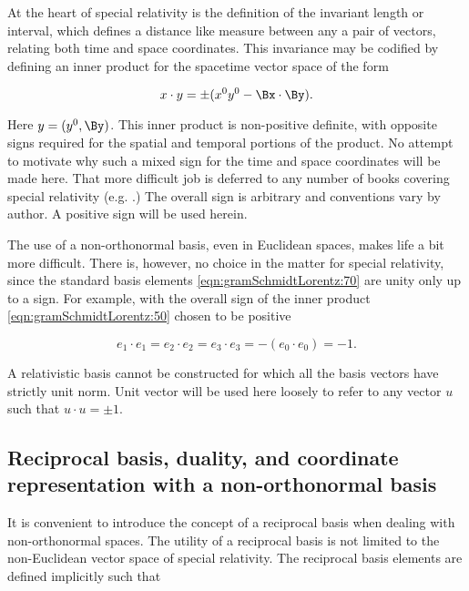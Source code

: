 At the heart of special relativity is the definition of the invariant length or interval, which defines a distance like measure between any a pair of vectors, relating both time and space coordinates.  This invariance may be codified by defining an inner product for the spacetime vector space of the form

\begin{equation}\label{eqn:gramSchmidtLorentz:50}
x \cdot y = \pm( x^0 y^0 - \Bx \cdot \By ).
\end{equation}

Here $y = (y^0, \By)$.  This inner product is non-positive definite, with opposite signs required for the spatial and temporal portions of the product.
No attempt to motivate why such a mixed sign for the time and space coordinates will be made here.  That more difficult job is deferred to any number of books covering special relativity
(e.g. \citep{landau1980classical}.)
The overall sign is arbitrary and conventions vary by author.  A positive sign will be used herein.

The use of a non-orthonormal basis, even in Euclidean spaces, makes life a bit more difficult.  There is, however, no choice in the matter for special relativity, since the standard basis elements \ref{eqn:gramSchmidtLorentz:70} are unity only up to a sign.  For example, with the overall sign of the inner product \ref{eqn:gramSchmidtLorentz:50} chosen to be positive

\begin{equation}\label{eqn:gramSchmidtLorentz:860}
e_1 \cdot e_1 = e_2 \cdot e_2 = e_3 \cdot e_3 = -( e_0 \cdot e_0 ) = -1.
\end{equation}

A relativistic basis cannot be constructed for which all the basis vectors have strictly unit norm.  Unit vector will be used here loosely to refer to any vector $u$ such that $u \cdot u = \pm 1$.

\subsection{Reciprocal basis, duality, and coordinate representation with a non-orthonormal basis}

It is convenient to introduce the concept of a reciprocal basis when dealing with non-orthonormal spaces.  The utility of a reciprocal basis is not limited to the non-Euclidean vector space of special relativity.  The reciprocal basis elements are defined implicitly such that

